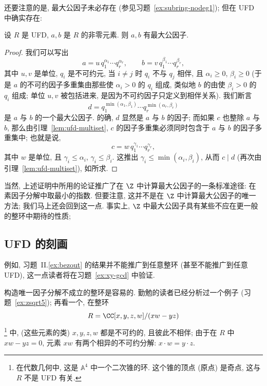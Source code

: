 \noindent 还要注意的是, 最大公因子未必存在 (参见习题~\ref{ex:subring-nodeg1}); 但在 UFD 中确实存在:

\begin{lemma}\label{lem:ufd-gcd}
设 $R$ 是 UFD, $a,b$ 是 $R$ 的非零元素. 则 $a,b$ 有最大公因子.
\end{lemma}

\begin{proof}
我们可以写出
\[
a = u\,q_1^{\alpha_1}\cdots q_r^{\alpha_r},\qquad
b = v\,q_1^{\beta_1}\cdots q_r^{\beta_r},
\]
其中 $u,v$ 是单位, $q_i$ 是不可约元, 当 $i\neq j$ 时 $q_i$ 不与 $q_j$ 相伴, 且 $\alpha_i\ge 0$, $\beta_i\ge 0$
(于是 $a$ 的不可约因子多重集由那些使 $\alpha_i>0$ 的 $q_i$ 组成, 类似地 $b$ 的由使 $\beta_i>0$ 的 $q_i$ 组成;
单位 $u,v$ 被包括进来, 是因为不可约因子只定义到相伴关系). 我们断言
\[
d = q_1^{\min(\alpha_1,\beta_1)}\cdots q_r^{\min(\alpha_r,\beta_r)}
\]
是 $a$ 与 $b$ 的一个最大公因子. 的确, $d$ 显然是 $a$ 与 $b$ 的因子; 而如果 $c$ 也整除 $a$ 与 $b$, 那么由引理~\ref{lem:ufd-multiset},
$c$ 的因子多重集必须同时包含于 $a$ 与 $b$ 的因子多重集中; 也就是说,
\[
c = w\,q_1^{\gamma_1}\cdots q_r^{\gamma_r},
\]
其中 $w$ 是单位, 且 $\gamma_i\le \alpha_i$, $\gamma_i\le \beta_i$. 这推出 $\gamma_i\le \min(\alpha_i,\beta_i)$,
从而 $c\mid d$ (再次由引理~\ref{lem:ufd-multiset}), 如所求.
\end{proof}

\noindent 当然, 上述证明中所用的论证推广了在 $\Z$ 中计算最大公因子的一条标准途径: 在素因子分解中取最小的指数.
但要注意, 这并不是在 $\Z$ 中计算最大公因子的唯一方法; 我们马上还会回到这一点. 事实上, $\Z$ 中最大公因子具有某些不应在更一般的整环中期待的性质;

\subsection{UFD 的刻画}
\label{subsec:ufd-characterization}

\noindent 例如, 习题~II.\ref{ex:bezout} 的结果并不能推广到任意整环 (甚至不能推广到任意 UFD), 这一点读者将在习题~\ref{ex:xy-gcd} 中验证.

构造唯一因子分解不成立的整环是容易的. 勤勉的读者已经分析过一个例子 (习题~\ref{ex:zsqrt5}); 再看一个,
在整环
\[
R = \CC[x,y,z,w]/(xw-yz)
\]\footnote{在代数几何中, 这是 $\mathbb A^4$ 中一个二次锥的环. 这个锥的顶点 (原点) 是奇点, 这与 $R$ 不是 UFD 有关.}
中, (这些元素的类) $x,y,z,w$ 都是不可约的, 且彼此不相伴; 由于在 $R$ 中 $xw-yz=0$, 元素 $xw$ 有两个相异的不可约分解:
$x\cdot w=y\cdot z$.

